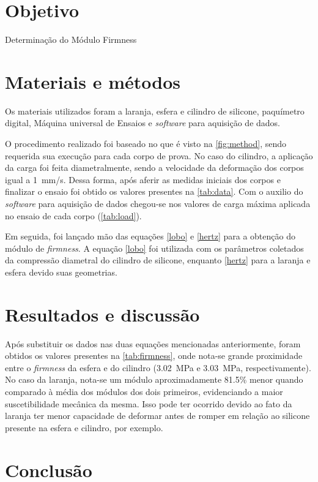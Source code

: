 \documentclass[a4paper, brazilian]{article}
\begin{document}
	\section{Objetivo}
	
	Determinação do Módulo Firmness
	
	\section{Materiais e métodos}
	
	Os materiais utilizados foram a laranja, esfera e cilindro de silicone, paquímetro digital, Máquina universal de Ensaios e \textit{software} para aquisição de dados.
	
	O procedimento realizado foi baseado no que é visto na \cref{fig:method},  sendo requerida sua execução para cada corpo de prova. No caso do cilindro, a aplicação da carga foi feita diametralmente, sendo  a velocidade da deformação dos corpos igual a \SI{1}{\milli\meter/\second}. Dessa forma, após aferir as medidas iniciais dos corpos e finalizar o ensaio foi obtido os valores presentes na \cref{tab:data}. Com o auxilio do \textit{software} para aquisição de dados chegou-se nos valores de carga máxima aplicada no ensaio de cada corpo (\cref{tab:load}).
	
	Em seguida, foi lançado mão das equações \eqref{lobo} e \eqref{hertz} para a obtenção do módulo de \textit{firmness}. A equação \eqref{lobo} foi utilizada com os parâmetros coletados da compressão diametral do cilindro de silicone, enquanto \eqref{hertz} para a laranja e esfera devido suas geometrias.

	\section{Resultados e discussão}
	
	Após substituir os dados nas duas equações mencionadas anteriormente, foram obtidos os valores presentes na \cref{tab:firmness}, onde nota-se grande proximidade entre o \textit{firmness} da esfera e do cilindro (\SI{3.02}{\mega\pascal} e \SI{3.03}{\mega\pascal}, respectivamente). No caso da laranja, nota-se um módulo aproximadamente 81.5\% menor quando comparado à média dos módulos dos dois primeiros, evidenciando a maior suscetibilidade mecânica da mesma. Isso pode ter ocorrido devido ao fato da laranja ter menor capacidade de deformar antes de romper em relação ao silicone presente na esfera e cilindro, por exemplo.
	
	\section{Conclusão}
	
\end{document}
